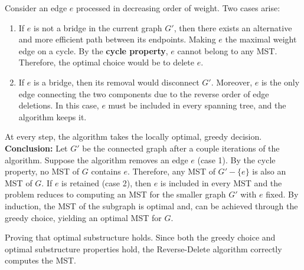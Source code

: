 \documentclass{article}[12pt]
\begin{document}
Consider an edge \( e \) processed in decreasing order of weight. Two cases arise:
\begin{enumerate}
    \item If \( e \) is not a bridge in the current graph \( G' \),
      then there exists an alternative and more efficient path between its endpoints.
      Making \( e \) the maximal weight edge on a cycle.
      By the \textbf{cycle property}, \( e \) cannot belong to any MST.
      Therefore, the optimal choice would be to delete \( e \).
    \item If \( e \) is a bridge, then its removal would disconnect \( G' \).
      Moreover, \( e \) is the only edge connecting the two components due to the reverse order of edge deletions.
      In this case, \( e \) must be included in every spanning tree, and the algorithm keeps it.
\end{enumerate}
At every step, the algorithm takes the locally optimal, greedy decision. \\

\textbf{Conclusion: }
Let \( G' \) be the connected graph after a couple iterations of the algorithm.
Suppose the algorithm removes an edge \( e \) (case 1).
By the cycle property, no MST of \( G \) contains \( e \).
Therefore, any MST of \( G' - \{e\} \) is also an MST of \( G \).
If \( e \) is retained (case 2), then \( e \) is included in every MST
and the problem reduces to computing an MST for the smaller graph \( G' \) with \( e \) fixed.
By induction, the MST of the subgraph is optimal and, can be achieved through the greedy choice, yielding an optimal MST for \( G \).

Proving that optimal substructure holds.
Since both the greedy choice and optimal substructure properties hold, the Reverse-Delete algorithm correctly computes the MST.

\newpage
\end{document}
